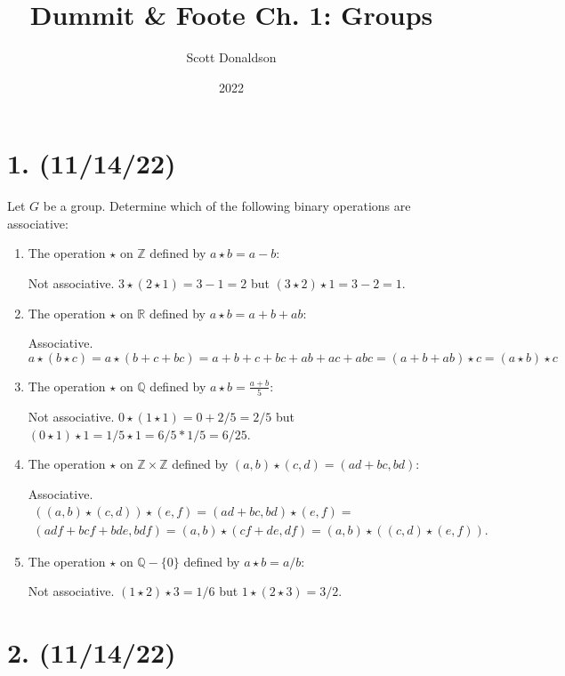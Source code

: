 \documentclass{article}
\title{Dummit \& Foote Ch. 1: Groups}
\author{Scott Donaldson}
\date{2022}
\begin{document}
\maketitle

\section*{1. (11/14/22)}

Let $G$ be a group. Determine which of the following binary operations are associative:

\begin{enumerate}[label=(\alph*)]
    \item The operation $\star$ on $\mathbb{Z}$ defined by $a \star b = a - b:$
    
          Not associative. $3 \star (2 \star 1) = 3 - 1 = 2$ but $(3 \star 2) \star 1 = 3 - 2 = 1$.
    \item The operation $\star$ on $\mathbb{R}$ defined by $a \star b = a + b + ab:$
    
          Associative. 
          \begin{equation*}
            a \star (b \star c) = a \star (b + c + bc) = a + b + c + bc + ab + ac + abc =
            (a + b + ab) \star c = (a \star b) \star c
          \end{equation*}
    \item The operation $\star$ on $\mathbb{Q}$ defined by $a \star b = \frac{a + b}{5}$:
    
          Not associative. $0 \star (1 \star 1) = 0 + 2/5 = 2/5$ but $(0 \star 1) \star 1 = 1/5 \star 1 = 6/5 * 1/5 = 6/25$.
    \item The operation $\star$ on $\mathbb{Z} \times \mathbb{Z}$ defined by $(a, b) \star (c, d) = (ad + bc, bd):$
    
          Associative.
          \begin{multline*}
            ((a,b)\star(c,d))\star(e,f) = (ad + bc, bd)\star(e,f) = \\
            (adf + bcf + bde, bdf) = (a,b)\star(cf + de, df) = (a,b)\star((c,d)\star(e,f)).
          \end{multline*}
    \item The operation $\star$ on $\mathbb{Q} - \{0\}$ defined by $a \star b = a / b:$
    
          Not associative. $(1 \star 2) \star 3 = 1/6$ but $1 \star (2 \star 3) = 3/2$.
\end{enumerate}

\section*{2. (11/14/22)}
\end{document}
